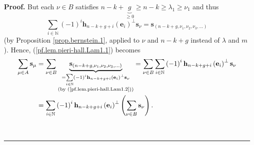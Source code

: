 \documentclass[numbers=enddot,12pt,final,onecolumn,notitlepage]{scrartcl}%
\theoremstyle{definition}
\newenvironment{proof}[1][Proof]{\noindent\textbf{#1.} }{\ \rule{0.5em}{0.5em}}
\let\sumnonlimits\sum
\renewcommand{\sum}{\sumnonlimits\limits}
\begin{document}
\begin{proof}
But each $\nu\in B$ satisfies $n-k+\underbrace{g}_{\geq0}\geq n-k\geq
\lambda_{1}\geq\nu_{1}$ and thus%
\begin{equation}
\sum_{i\in\mathbb{N}}\left(  -1\right)  ^{i}\mathbf{h}_{n-k+g+i}\left(
\mathbf{e}_{i}\right)  ^{\perp}\mathbf{s}_{\nu}=\mathbf{s}_{\left(
n-k+g,\nu_{1},\nu_{2},\nu_{3},\ldots\right)  }
\label{pf.lem.pieri-hall.Lam1.2}%
\end{equation}
(by Proposition \ref{prop.bernstein.1}, applied to $\nu$ and $n-k+g$ instead
of $\lambda$ and $m$). Hence, (\ref{pf.lem.pieri-hall.Lam1.1}) becomes%
\begin{align}
\sum_{\mu\in A}\mathbf{s}_{\mu}  &  =\sum_{\nu\in B}\underbrace{\mathbf{s}%
_{\left(  n-k+g,\nu_{1},\nu_{2},\nu_{3},\ldots\right)  }}_{\substack{=\sum
_{i\in\mathbb{N}}\left(  -1\right)  ^{i}\mathbf{h}_{n-k+g+i}\left(
\mathbf{e}_{i}\right)  ^{\perp}\mathbf{s}_{\nu}\\\text{(by
(\ref{pf.lem.pieri-hall.Lam1.2}))}}}=\sum_{\nu\in B}\sum_{i\in\mathbb{N}%
}\left(  -1\right)  ^{i}\mathbf{h}_{n-k+g+i}\left(  \mathbf{e}_{i}\right)
^{\perp}\mathbf{s}_{\nu}\nonumber\\
&  =\sum_{i\in\mathbb{N}}\left(  -1\right)  ^{i}\mathbf{h}_{n-k+g+i}\left(
\mathbf{e}_{i}\right)  ^{\perp}\left(  \sum_{\nu\in B}\mathbf{s}_{\nu}\right)
. \label{pf.lem.pieri-hall.Lam1.3}%
\end{align}



\end{proof}
\end{document}
